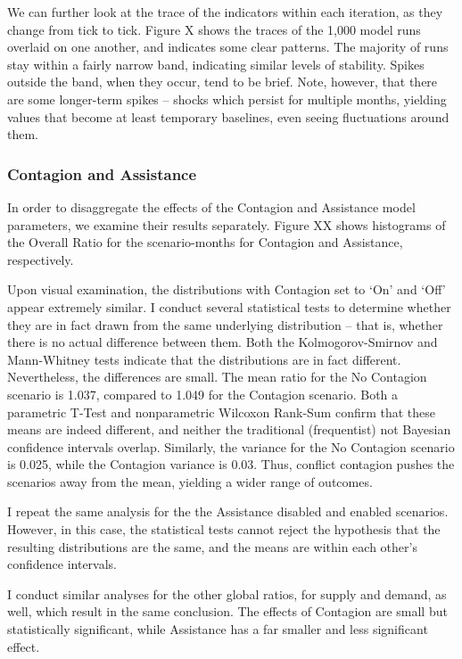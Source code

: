 \documentclass{article}
\begin{document}
We can further look at the trace of the indicators within each iteration, as they change from tick to tick. Figure X shows the traces of the 1,000 model runs overlaid on one another, and indicates some clear patterns. The majority of runs stay within a fairly narrow band, indicating similar levels of stability. Spikes outside the band, when they occur, tend to be brief. Note, however, that there are some longer-term spikes -- shocks which persist for multiple months, yielding values that become at least temporary baselines, even seeing fluctuations around them.

\subsubsection{Contagion and Assistance}

In order to disaggregate the effects of the Contagion and Assistance model parameters, we examine their results separately. Figure XX shows histograms of the Overall Ratio for the scenario-months for Contagion and Assistance, respectively.

Upon visual examination, the distributions with Contagion set to `On' and `Off' appear extremely similar. I conduct several statistical tests to determine whether they are in fact drawn from the same underlying distribution -- that is, whether there is no actual difference between them. Both the Kolmogorov-Smirnov  and Mann-Whitney tests indicate that the distributions are in fact different. Nevertheless, the differences are small. The mean ratio for the No Contagion scenario is 1.037, compared to 1.049 for the Contagion scenario. Both a parametric T-Test and nonparametric Wilcoxon Rank-Sum confirm that these means are indeed different, and neither the traditional (frequentist) not Bayesian confidence intervals overlap. Similarly, the variance for the No Contagion scenario is 0.025, while the Contagion variance is 0.03. Thus, conflict contagion pushes the scenarios away from the mean, yielding a wider range of outcomes. 

I repeat the same analysis for the the Assistance disabled and enabled scenarios. However, in this case, the statistical tests cannot reject the hypothesis that the resulting distributions are the same, and the means are within each other's confidence intervals.

I conduct similar analyses for the other global ratios, for supply and demand, as well, which result in the same conclusion. The effects of Contagion are small but statistically significant, while Assistance has a far smaller and less significant effect.
\end{document}
